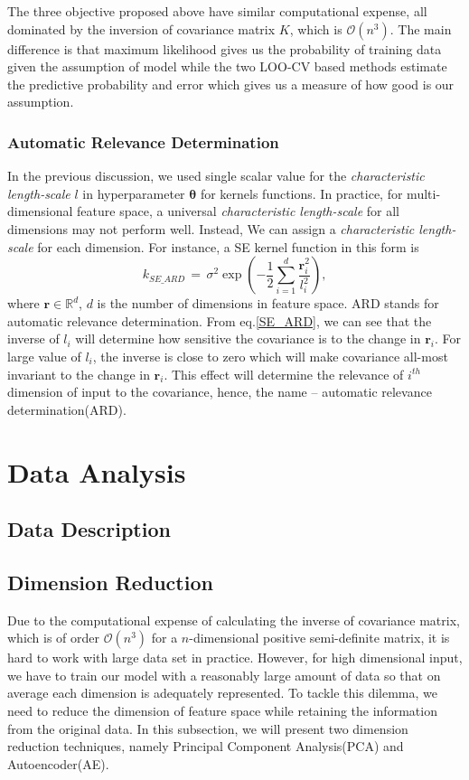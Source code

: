 \documentclass[11pt,a4paper]{article}
\theoremstyle{definition}
\numberwithin{equation}{section}
\let\vec\mathbf
\begin{document}
The three objective proposed above have similar computational expense, all dominated by the inversion of covariance matrix $K$, which is $\mathcal O(n^3)$. The main difference is that maximum likelihood gives us the probability of training data given the assumption of model while the two LOO-CV based methods estimate the predictive probability and error which gives us a measure of how good is our assumption. 

\subsubsection{Automatic Relevance Determination}
In the previous discussion, we used single scalar value for the \textit{characteristic length-scale} $l$ in hyperparameter $\vec \theta$ for kernels functions. In practice, for multi-dimensional feature space, a universal \textit{characteristic length-scale} for all dimensions may not perform well. Instead, We can assign a \textit{characteristic length-scale} for each dimension. For instance, a SE kernel function in this form is
\begin{equation}\label{SE_ARD}
k_{SE\_ARD}\, = \, \sigma^2\exp\left(-\frac{1}{2}\sum_{i=1}^{d}\frac{\vec r^2_i}{ l^2_i}\right),
\end{equation}
where $\vec r \in \mathbb R^d$, $d$ is the number of dimensions in feature space. ARD stands for automatic relevance determination\cite[Neal]{Neal}. 
From eq.\ref{SE_ARD}, we can see that the inverse of $l_i$ will determine how sensitive the covariance is to the change in $\vec r_i$. For large value of $l_i$, the inverse is close to zero which will make covariance all-most invariant to the change in $\vec r_i$. This effect will determine the relevance of $i^{th}$ dimension of input to the covariance, hence, the name -- automatic relevance determination(ARD).
\newpage

\section{Data Analysis}

\subsection{Data Description}

\subsection{Dimension Reduction}
Due to the computational expense of calculating the inverse of covariance matrix, which is of order $\mathcal O(n^3)$ for a $n$-dimensional positive semi-definite matrix, it is hard to work with large data set in practice. However, for high dimensional input, we have to train our model with a reasonably large amount of data so that on average each dimension is adequately represented. To tackle this dilemma, we need to reduce the dimension of feature space while retaining the information from the original data. In this subsection, we will present two dimension reduction techniques, namely Principal Component Analysis(PCA) and Autoencoder(AE). 
\end{document}
